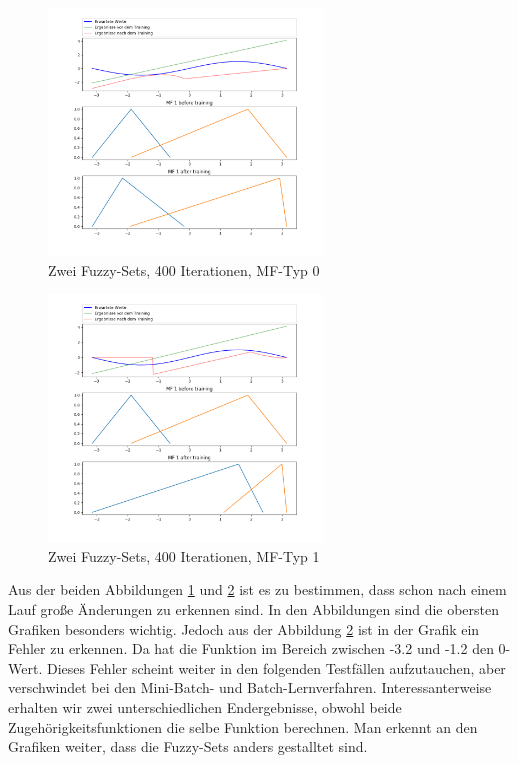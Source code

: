 \begin{figure}[htbp]
	\centering
	\includegraphics[width=0.65\textwidth]{images/sinus/Stochastic/sinus 1 Input 2 Sets 400 Epochs Stochastic Gradient Descent two equations mf.png}
	\caption{Zwei Fuzzy-Sets, 400 Iterationen, MF-Typ 0} \label{2Sets400_Stoch_0}
\end{figure}



\begin{figure}[htbp]
	\centering
	\includegraphics[width=0.65\textwidth]{images/sinus/Stochastic/sinus 1 Input 2 Sets 400 Epochs Stochastic Gradient Descent one equation mf.png}
	\caption{Zwei Fuzzy-Sets, 400 Iterationen, MF-Typ 1} \label{2Sets400_Stoch_1}
\end{figure}

Aus der beiden Abbildungen \ref{2Sets400_Stoch_0} und \ref{2Sets400_Stoch_1} ist es zu bestimmen, dass schon nach einem Lauf große Änderungen zu erkennen sind. In den Abbildungen sind die obersten Grafiken besonders wichtig. Jedoch aus der Abbildung \ref{2Sets400_Stoch_1} ist in der Grafik ein Fehler zu erkennen. Da hat die Funktion im Bereich zwischen -3.2 und -1.2 den 0-Wert. Dieses Fehler scheint weiter in den folgenden Testfällen aufzutauchen, aber verschwindet bei den Mini-Batch- und Batch-Lernverfahren. Interessanterweise erhalten wir zwei unterschiedlichen Endergebnisse, obwohl beide Zugehörigkeitsfunktionen die selbe Funktion berechnen. Man erkennt an den Grafiken weiter, dass die Fuzzy-Sets anders gestalltet sind.

